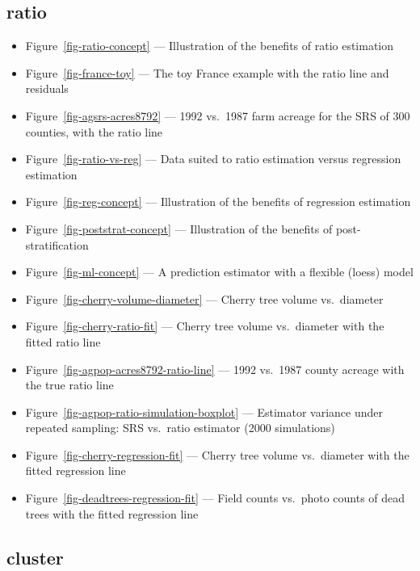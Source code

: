 \documentclass[
  letterpaper,
  DIV=11,
  numbers=noendperiod]{scrreprt}
\providecommand{\tightlist}{%
  \setlength{\itemsep}{0pt}\setlength{\parskip}{0pt}}
\renewcommand{\[}{\begin{equation}}
\renewcommand{\]}{\end{equation}}
\begin{document}
\subsection{ratio}\label{ratio}

\begin{itemize}
\tightlist
\item
  Figure~\ref{fig-ratio-concept} --- Illustration of the benefits of
  ratio estimation
\item
  Figure~\ref{fig-france-toy} --- The toy France example with the ratio
  line and residuals
\item
  Figure~\ref{fig-agsrs-acres8792} --- 1992 vs.~1987 farm acreage for
  the SRS of 300 counties, with the ratio line
\item
  Figure~\ref{fig-ratio-vs-reg} --- Data suited to ratio estimation
  versus regression estimation
\item
  Figure~\ref{fig-reg-concept} --- Illustration of the benefits of
  regression estimation
\item
  Figure~\ref{fig-poststrat-concept} --- Illustration of the benefits of
  post-stratification
\item
  Figure~\ref{fig-ml-concept} --- A prediction estimator with a flexible
  (loess) model
\item
  Figure~\ref{fig-cherry-volume-diameter} --- Cherry tree volume
  vs.~diameter
\item
  Figure~\ref{fig-cherry-ratio-fit} --- Cherry tree volume vs.~diameter
  with the fitted ratio line
\item
  Figure~\ref{fig-agpop-acres8792-ratio-line} --- 1992 vs.~1987 county
  acreage with the true ratio line
\item
  Figure~\ref{fig-agpop-ratio-simulation-boxplot} --- Estimator variance
  under repeated sampling: SRS vs.~ratio estimator (2000 simulations)
\item
  Figure~\ref{fig-cherry-regression-fit} --- Cherry tree volume
  vs.~diameter with the fitted regression line
\item
  Figure~\ref{fig-deadtrees-regression-fit} --- Field counts vs.~photo
  counts of dead trees with the fitted regression line
\end{itemize}

\subsection{cluster}\label{cluster}
\end{document}
